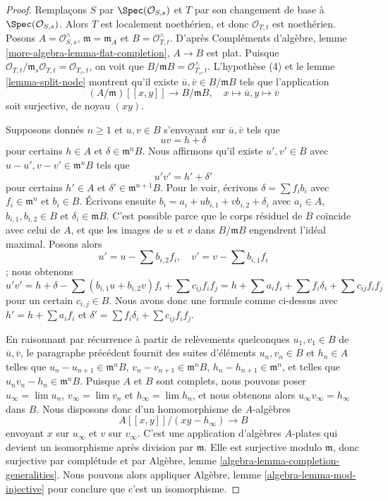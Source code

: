 \begin{proof}
Remplaçons $S$ par $\Spec(\mathcal{O}_{S, s})$ et $T$ par son changement de base à $\Spec(\mathcal{O}_{S, s})$. Alors $T$ est localement noethérien, et donc $\mathcal{O}_{T, t}$ est noethérien. Posons $A = \mathcal{O}_{S, s}^\wedge$, $\mathfrak m = \mathfrak m_A$ et $B = \mathcal{O}_{T, t}^\wedge$. D'après Compléments d'algèbre, lemme \ref{more-algebra-lemma-flat-completion}, $A \to B$ est plat. Puisque $\mathcal{O}_{T, t}/\mathfrak m_s \mathcal{O}_{T, t} = \mathcal{O}_{T_s, t}$, on voit que $B/\mathfrak m B = \mathcal{O}_{T_s, t}^\wedge$. L'hypothèse (4) et le lemme \ref{lemma-split-node} montrent qu'il existe $\overline{u}, \overline{v} \in B/\mathfrak m B$ tels que l'application $$
(A/\mathfrak m)[[x, y]] \longrightarrow B/\mathfrak m B,\quad
x \longmapsto \overline{u},
y \longmapsto \overline{v}
$$ soit surjective, de noyau $(xy)$.

\medskip\noindent
Supposons donnés $n \geq 1$ et $u, v \in B$ s'envoyant sur $\overline{u}, \overline{v}$ tels que $$
u v = h + \delta
$$ pour certains $h \in A$ et $\delta \in \mathfrak m^nB$. Nous affirmons qu'il existe $u', v' \in B$ avec $u - u', v - v' \in \mathfrak m^n B$ tels que $$
u' v' = h' + \delta'
$$ pour certains $h' \in A$ et $\delta' \in \mathfrak m^{n + 1}B$. Pour le voir, écrivons $\delta = \sum f_i b_i$ avec $f_i \in \mathfrak m^n$ et $b_i \in B$. Écrivons ensuite $b_i = a_i + u b_{i, 1} + v b_{i, 2} + \delta_i$ avec $a_i \in A$, $b_{i, 1}, b_{i, 2} \in B$ et $\delta_i \in \mathfrak m B$. C'est possible parce que le corps résiduel de $B$ coïncide avec celui de $A$, et que les images de $u$ et $v$ dans $B/\mathfrak m B$ engendrent l'idéal maximal. Posons alors $$
u' = u - \sum b_{i, 2}f_i,\quad
v' = v - \sum b_{i, 1}f_i
$$; nous obtenons $$
u'v' = h + \delta - \sum (b_{i, 1}u + b_{i, 2}v)f_i + \sum
c_{ij}f_if_j =
h + \sum a_if_i + \sum f_i \delta_i + \sum c_{ij}f_if_j
$$ pour un certain $c_{i, j} \in B$. Nous avons donc une formule comme ci-dessus avec $h' = h + \sum a_if_i$ et $\delta' = \sum f_i \delta_i + \sum c_{ij}f_if_j$.

\medskip\noindent
En raisonnant par récurrence à partir de relèvements quelconques $u_1, v_1 \in B$ de $\overline{u}, \overline{v}$, le paragraphe précédent fournit des suites d'éléments $u_n, v_n \in B$ et $h_n \in A$ telles que $u_n - u_{n + 1} \in \mathfrak m^n B$, $v_n - v_{n + 1} \in \mathfrak m^n B$, $h_n - h_{n + 1} \in \mathfrak m^n$, et telles que $u_n v_n - h_n \in \mathfrak m^n B$. Puisque $A$ et $B$ sont complets, nous pouvons poser $u_\infty = \lim u_n$, $v_\infty = \lim v_n$ et $h_\infty = \lim h_n$, et nous obtenons alors $u_\infty v_\infty = h_\infty$ dans $B$. Nous disposons donc d'un homomorphisme de $A$-algèbres $$
A[[x, y]]/(xy - h_\infty) \longrightarrow B
$$ envoyant $x$ sur $u_\infty$ et $v$ sur $v_\infty$. C'est une application d'algèbres $A$-plates qui devient un isomorphisme après division par $\mathfrak m$. Elle est surjective modulo $\mathfrak m$, donc surjective par complétude et par Algèbre, lemme \ref{algebra-lemma-completion-generalities}. Nous pouvons alors appliquer Algèbre, lemme \ref{algebra-lemma-mod-injective} pour conclure que c'est un isomorphisme.
\end{proof}

